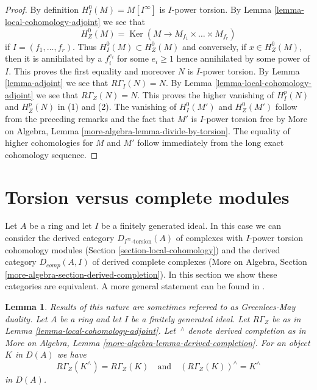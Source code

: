 \documentclass{stacks-project}
\newenvironment{slogan}{\comment}{\endcomment}
\theoremstyle{plain}
\newtheorem{lemma}[subsection]{Lemma}
\theoremstyle{definition}
\theoremstyle{remark}
\numberwithin{equation}{subsection}
\def\Ker{\mathop{\mathrm{Ker}}}
\begin{document}
\begin{proof}
By definition $H^0_I(M) = M[I^\infty]$ is $I$-power torsion.
By Lemma \ref{lemma-local-cohomology-adjoint} we see that
$$
H^0_Z(M) = \Ker(M \longrightarrow M_{f_1} \times \ldots \times M_{f_r})
$$
if $I = (f_1, \ldots, f_r)$. Thus $H^0_I(M) \subset H^0_Z(M)$ and
conversely, if $x \in H^0_Z(M)$, then it is annihilated by a $f_i^{e_i}$
for some $e_i \geq 1$ hence annihilated by some power of $I$.
This proves the first equality and moreover $N$ is $I$-power torsion.
By Lemma \ref{lemma-adjoint} we see that $R\Gamma_I(N) = N$.
By Lemma \ref{lemma-local-cohomology-adjoint} we see that $R\Gamma_Z(N) = N$.
This proves the higher vanishing of $H^p_I(N)$ and $H^p_Z(N)$ in (1) and (2).
The vanishing of $H^0_I(M')$ and $H^0_Z(M')$ follow from the preceding
remarks and the fact that $M'$ is $I$-power torsion free by
More on Algebra, Lemma \ref{more-algebra-lemma-divide-by-torsion}.
The equality of higher cohomologies for $M$ and $M'$ follow
immediately from the long exact cohomology sequence.
\end{proof}









\section{Torsion versus complete modules}
\label{section-torsion-and-complete}

\noindent
Let $A$ be a ring and let $I$ be a finitely generated ideal.
In this case we can consider the derived category
$D_{I^\infty\text{-torsion}}(A)$ of complexes
with $I$-power torsion cohomology modules
(Section \ref{section-local-cohomology})
and the derived category
$D_{comp}(A, I)$ of derived complete complexes
(More on Algebra, Section \ref{more-algebra-section-derived-completion}).
In this section we show these categories are equivalent.
A more general statement can be found in
\cite{Dwyer-Greenlees}.

\begin{lemma}
\label{lemma-complete-and-local}
\begin{slogan}
Results of this nature are sometimes referred to as Greenlees-May duality.
\end{slogan}
Let $A$ be a ring and let $I$ be a finitely generated ideal.
Let $R\Gamma_Z$ be as in Lemma \ref{lemma-local-cohomology-adjoint}.
Let ${\ }^\wedge$ denote derived completion as in
More on Algebra, Lemma \ref{more-algebra-lemma-derived-completion}.
For an object $K$ in $D(A)$ we have
$$
R\Gamma_Z(K^\wedge) = R\Gamma_Z(K)
\quad\text{and}\quad
(R\Gamma_Z(K))^\wedge = K^\wedge
$$
in $D(A)$.
\end{lemma}
\end{document}
